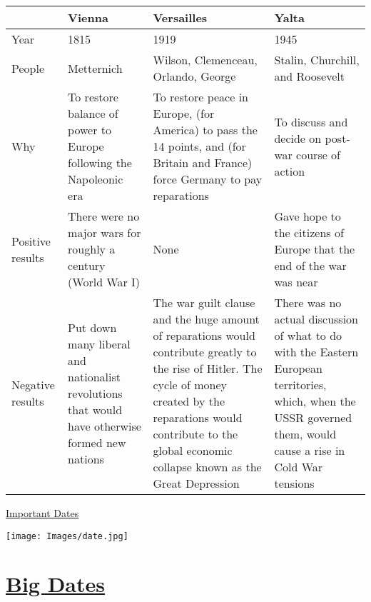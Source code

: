 \documentclass[12pt]{article}
\begin{document}
\begin{enumerate}
\begin{tabular}{|p{}|p{}|p{}|p{}|}
\hline
& Vienna & Versailles & Yalta \\
\hline
Year & 1815 & 1919 & 1945 \\
\hline
People & Metternich & Wilson, Clemenceau, Orlando, George & Stalin, Churchill, and Roosevelt \\
\hline
Why & To restore balance of power to Europe following the Napoleonic era & To restore peace in Europe, (for America) to pass the 14 points, and (for Britain and France) force Germany to pay reparations & To discuss and decide on post-war course of action\\
\hline
Positive results & There were no major wars for roughly a century (World War I) & None  & Gave hope to the citizens of Europe that the end of the war was near \\
\hline
Negative results & Put down many liberal and nationalist revolutions that would have otherwise formed new nations & The war guilt clause and the huge amount of reparations would contribute greatly to the rise of Hitler. The cycle of money created by the reparations would contribute to the global economic collapse known as the Great Depression & There was no actual discussion of what to do with the Eastern European territories, which, when the USSR governed them, would cause a rise in Cold War tensions  \\
\hline
\end{tabular}

\newpage
\begin{center}
\end{center}
\begin{center}
\end{center}
\begin{center}
\underline{\Huge Important Dates}
\end{center}
\vspace{50pt}
\begin{center}
\texttt{[image: Images/date.jpg]}
\end{center}
\newpage

\section{\underline{Big Dates}}



\end{enumerate}
\end{document}
